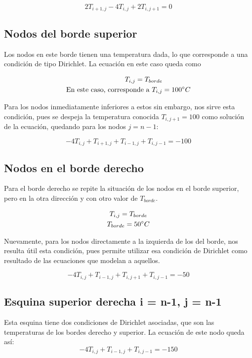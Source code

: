 \documentclass[12pt, notitlepage]{article}
\begin{document}
\begin{equation*}
2T_{i+1,j} - 4T_{i,j} + 2T_{i,j+1} = 0
\end{equation*}

\subsection{Nodos del borde superior}
Los nodos en este borde tienen una temperatura dada, lo que corresponde a una condición de tipo Dirichlet. La ecuación en este caso queda como

\begin{align*}
T_{i,j} = T_{borde}&\\
\text{En este caso, corresponde a}\ T_{i,j} &= 100\degree C
\end{align*}

Para los nodos inmediatamente inferiores a estos sin embargo, nos sirve esta condición, pues se despeja la temperatura conocida $T_{i,j+1} = 100$ como solución de la ecuación, quedando para los nodos $j=n-1$:

\begin{equation*}
-4T_{i,j} + T_{i+1,j} + T_{i-1,j} + T_{i,j-1} = -100
\end{equation*}

\subsection{Nodos en el borde derecho}
Para el borde derecho se repite la situación de los nodos en el borde superior, pero en la otra dirección y con otro valor de $T_{borde}$.

\begin{gather*}
T_{i,j} = T_{borde} \\
T_{borde} = 50\degree C
\end{gather*}

Nuevamente, para los nodos directamente a la izquierda de los del borde, nos resulta útil esta condición, pues permite utilizar esa condición de Dirichlet como resultado de las ecuaciones que modelan a aquellos.

\begin{equation*}
-4T_{i,j} + T_{i-1,j} + T_{i,j+1} + T_{i,j-1} = -50
\end{equation*}

\subsection{Esquina superior derecha i = n-1, j = n-1}
Esta esquina tiene dos condiciones de Dirichlet asociadas, que son las temperaturas de los bordes derecho y superior. La ecuación de este nodo queda así:
\begin{equation}
-4T_{i,j} + T_{i-1,j} + T_{i,j-1} = -150
\end{equation}
\end{document}
